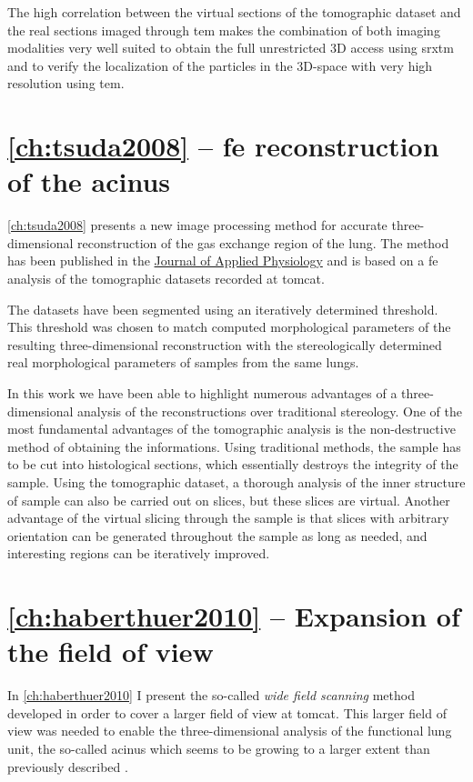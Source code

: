 The high correlation between the virtual sections of the tomographic dataset and the real sections imaged through \ac{tem} makes the combination of both imaging modalities very well suited to obtain the full unrestricted 3D access using \ac{srxtm} and to verify the localization of the particles in the 3D-space with very high resolution using \ac{tem}.

\section{\autoref{ch:tsuda2008} -- \acs{fe} \threed reconstruction of the acinus}
\autoref{ch:tsuda2008} presents a new image processing method for accurate three-dimensional reconstruction of the gas exchange region of the lung. The method has been published in the \href{http://jap.physiology.org/}{Journal of Applied Physiology} and is based on a \ac{fe} analysis of the tomographic datasets recorded at \ac{tomcat}. 

The datasets have been segmented using an iteratively determined threshold. This threshold was chosen to match computed morphological parameters of the resulting three-dimensional reconstruction with the stereologically determined real morphological parameters of samples from the same lungs.

In this work we have been able to highlight numerous advantages of a three-dimensional analysis of the reconstructions over traditional stereology. One of the most fundamental advantages of the tomographic analysis is the non-destructive method of obtaining the informations. Using traditional methods, the sample has to be cut into histological sections, which essentially destroys the integrity of the sample. Using the tomographic dataset, a thorough analysis of the inner structure of sample can also be carried out on slices, but these slices are virtual. Another advantage of the virtual slicing through the sample is that slices with arbitrary orientation can be generated throughout the sample as long as needed, and interesting regions can be iteratively improved.

\section{\autoref{ch:haberthuer2010} -- Expansion of the field of view}
In \autoref{ch:haberthuer2010} I present the so-called \emph{wide field scanning} method developed in order to cover a larger field of view at \ac{tomcat}. This larger field of view was needed to enable the three-dimensional analysis of the functional lung unit, the so-called acinus which seems to be growing to a larger extent than previously described \cite{Massaro1985,Massaro1992}.

